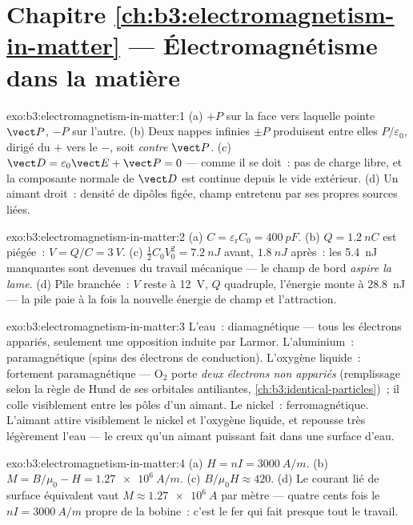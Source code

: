 \section*{Chapitre \ref{ch:b3:electromagnetism-in-matter} --- Électromagnétisme dans la matière}

\begin{solution}{exo:b3:electromagnetism-in-matter:1}
(a) $+P$ sur la face vers laquelle pointe $\vect P$, $-P$ sur
l'autre. (b) Deux nappes infinies $\pm P$ produisent entre elles
$P/\varepsilon_0$, dirigé du $+$ vers le $-$, soit \emph{contre}
$\vect P$. (c)
$\vect D = \varepsilon_0\vect E + \vect P = 0$ --- comme il se
doit~: pas de charge libre, et la composante normale de $\vect D$
est continue depuis le vide extérieur. (d) Un aimant droit~: densité
de dipôles figée, champ entretenu par ses propres sources liées.
\end{solution}

\begin{solution}{exo:b3:electromagnetism-in-matter:2}
(a) $C = \varepsilon_{\text{r}}C_0 = \qty{400}{pF}$. (b) $Q =
\qty{1.2}{nC}$ est piégée~: $V = Q/C = \qty{3}{V}$. (c)
$\tfrac12C_0V_0^2 = \qty{7.2}{nJ}$ avant, $\qty{1.8}{nJ}$ après~:
les \qty{5.4}{nJ} manquantes sont devenues du travail mécanique ---
le champ de bord \emph{aspire la lame}. (d) Pile branchée~: $V$
reste à \qty{12}{V}, $Q$ quadruple, l'énergie monte à
\qty{28.8}{nJ} --- la pile paie à la fois la nouvelle énergie de
champ et l'attraction.
\end{solution}

\begin{solution}{exo:b3:electromagnetism-in-matter:3}
L'eau~: diamagnétique --- tous les électrons appariés, seulement une
opposition induite par Larmor. L'aluminium~: paramagnétique (spins
des électrons de conduction). L'oxygène liquide~: fortement
paramagnétique --- O$_2$ porte \emph{deux électrons non appariés}
(remplissage selon la règle de Hund de ses orbitales antiliantes,
\cref{ch:b3:identical-particles})~; il colle visiblement entre les
pôles d'un aimant. Le nickel~: ferromagnétique. L'aimant attire
visiblement le nickel et l'oxygène liquide, et repousse très
légèrement l'eau --- le creux qu'un aimant puissant fait dans une
surface d'eau.
\end{solution}

\begin{solution}{exo:b3:electromagnetism-in-matter:4}
(a) $H = nI = \qty{3000}{A/m}$. (b) $M = B/\mu_0 - H =
\qty{1.27e6}{A/m}$. (c) $B/\mu_0H \approx 420$. (d) Le courant lié
de surface équivalent vaut $M \approx \qty{1.27e6}{A}$ par mètre ---
quatre cents fois le $nI = \qty{3000}{A/m}$ propre de la bobine~:
c'est le fer qui fait presque tout le travail.
\end{solution}

